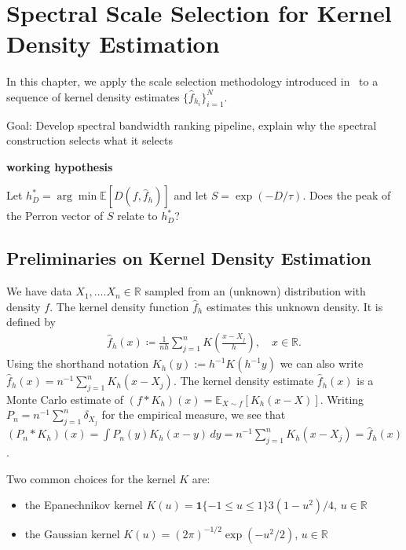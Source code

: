 \chapter{Spectral Scale Selection for Kernel Density Estimation}\label{chap:kde}

In this chapter, we apply the scale selection methodology introduced in~\cite{Baralic2026} to a sequence of kernel density estimates $\{\hat{f}_{h_i}\}_{i=1}^{N}$.

Goal: Develop spectral bandwidth ranking pipeline, explain why the spectral construction selects what it selects

\textbf{working hypothesis}

Let $h^*_D=\arg\min\mathbb{E}[D(f,\hat{f}_h)]$ and let $S=\exp{(-D/\tau)}$. Does the peak of the Perron vector of $S$ relate to $h^*_D$?



\section{Preliminaries on Kernel Density Estimation}

We have data $X_1,\dots.X_n\in\mathbb{R}$ sampled from an (unknown) distribution with density $f$. The kernel density function $\hat{f}_h$ estimates this unknown density. It is defined by
\begin{align*}
    \hat{f}_h(x)\coloneqq \frac{1}{nh}\sum_{j=1}^{n}K\left(\frac{x-X_j}{h}\right),\quad x\in\mathbb{R}.
\end{align*}
Using the shorthand notation $K_h(y):=h^{-1}K(h^{-1}y)$ we can also write $\hat{f}_h(x)=n^{-1}\sum_{j=1}^{n}K_h(x-X_j)$. The kernel density estimate $\hat{f}_h(x)$ is a Monte Carlo estimate of $(f\ast K_h)(x)=\mathbb{E}_{X\sim f}[K_h(x-X)]$. Writing $P_n=n^{-1}\sum_{j=1}^{n}\delta_{X_j}$ for the empirical measure, we see that $(P_n\ast K_h)(x)=\int P_n(y)K_h(x-y)\,dy=n^{-1}\sum_{j=1}^{n}K_h(x-X_j)=\hat{f}_h(x)$.

Two common choices for the kernel $K$ are:
\begin{itemize}
    \item the Epanechnikov kernel $K(u)=\mathbf{1}\{-1\le u\le1\}3(1-u^2)/4$, $u\in\mathbb{R}$
    \item the Gaussian kernel $K(u)=(2\pi)^{-1/2}\exp{(-u^2/2)}$, $u\in\mathbb{R}$
\end{itemize}

